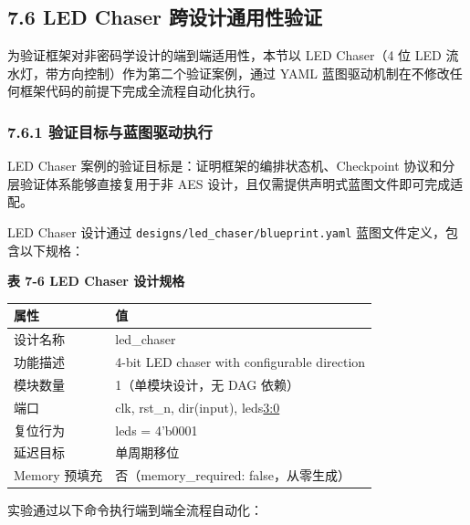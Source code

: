 \subsection{7.6 LED Chaser
跨设计通用性验证}\label{led-chaser-ux8de8ux8bbeux8ba1ux901aux7528ux6027ux9a8cux8bc1}

为验证框架对非密码学设计的端到端适用性，本节以 LED Chaser（4 位 LED
流水灯，带方向控制）作为第二个验证案例，通过 YAML
蓝图驱动机制在不修改任何框架代码的前提下完成全流程自动化执行。

\subsubsection{7.6.1
验证目标与蓝图驱动执行}\label{ux9a8cux8bc1ux76eeux6807ux4e0eux84ddux56feux9a71ux52a8ux6267ux884c}

LED Chaser 案例的验证目标是：证明框架的编排状态机、Checkpoint
协议和分层验证体系能够直接复用于非 AES
设计，且仅需提供声明式蓝图文件即可完成适配。

LED Chaser 设计通过 \texttt{designs/led\_chaser/blueprint.yaml}
蓝图文件定义，包含以下规格：

\textbf{表 7-6 LED Chaser 设计规格}

{\def\LTcaptype{none} %
\begin{longtable}[]{@{}ll@{}}
\toprule\noalign{}
属性 & 值 \\
\midrule\noalign{}
\endhead
\bottomrule\noalign{}
\endlastfoot
设计名称 & led\_chaser \\
功能描述 & 4-bit LED chaser with configurable direction \\
模块数量 & 1（单模块设计，无 DAG 依赖） \\
端口 & clk, rst\_n, dir(input), leds\href{output}{3:0} \\
复位行为 & leds = 4'b0001 \\
延迟目标 & 单周期移位 \\
Memory 预填充 & 否（memory\_required: false，从零生成） \\
\end{longtable}
}

实验通过以下命令执行端到端全流程自动化：

\begin{Shaded}
\begin{Highlighting}[]
\OperatorTok{=} \DataTypeTok{\textbackslash{}}
\end{Highlighting}
\end{Shaded}

